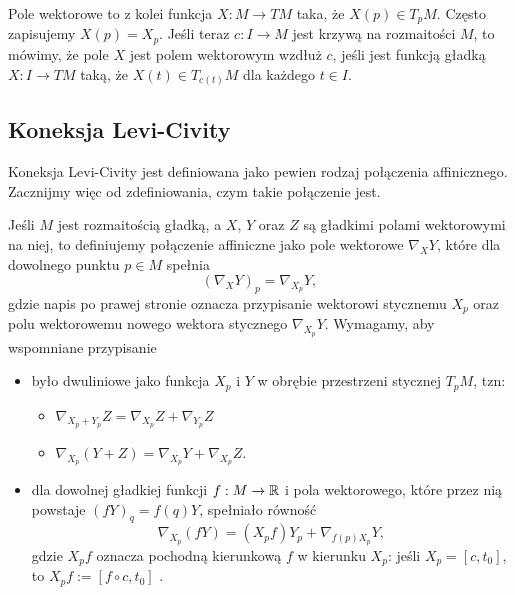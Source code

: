Pole wektorowe to z kolei funkcja $X:M\to TM$ taka, że $X(p)\in T_pM$. Często zapisujemy $X(p)=X_p$. Jeśli teraz $c:I\to M$ jest krzywą na rozmaitości $M$, to mówimy, że pole $X$ jest polem wektorowym wzdłuż $c$, jeśli jest funkcją gładką $X:I\to TM$ taką, że $X(t)\in T_{c(t)}M$ dla każdego $t\in I$.

\subsection{Koneksja Levi-Civity}
\label{dodatek koneksja}

Koneksja Levi-Civity jest definiowana jako pewien rodzaj połączenia affinicznego. Zacznijmy więc od zdefiniowania, czym takie połączenie jest. 

Jeśli $M$ jest rozmaitością gładką, a $X$, $Y$ oraz $Z$ są gładkimi polami wektorowymi na niej, to definiujemy połączenie affiniczne jako pole wektorowe $\nabla_XY$, które dla dowolnego punktu $p\in M$ spełnia
$$(\nabla_XY)_p=\nabla_{X_p}Y,$$
gdzie napis po prawej stronie oznacza przypisanie wektorowi stycznemu $X_p$ oraz polu wektorowemu nowego wektora stycznego $\nabla_{X_p}Y$. Wymagamy, aby wspomniane przypisanie
\begin{itemize}
  \item było dwuliniowe jako funkcja $X_p$ i $Y$ w obrębie przestrzeni stycznej $T_pM$, tzn:
    \begin{itemize}
      \item $\nabla_{X_p+Y_p}Z=\nabla_{X_p}Z+\nabla_{Y_p}Z$
      \item $\nabla_{X_p}(Y+Z)=\nabla_{X_p}Y+\nabla_{X_p}Z$.
    \end{itemize}
  \item dla dowolnej gładkiej funkcji $f:M\to\mathbb{R}$ i pola wektorowego, które przez nią powstaje $(fY)_q=f(q)Y$, spełniało równość
    $$\nabla_{X_p}(fY)=(X_pf)Y_p+\nabla_{f(p)X_p}Y,$$
    gdzie $X_pf$ oznacza pochodną kierunkową $f$ w kierunku $X_p$: jeśli $X_p=[c, t_0]$, to $X_pf:=[f\circ c, t_0]$ \cite{morseTheory}.
\end{itemize}


